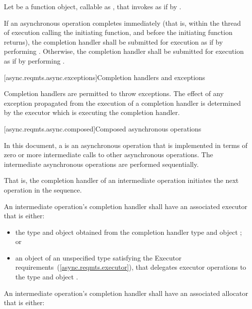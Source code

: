 \pnum
Let  be a function object, callable as , that invokes  as if by .

\pnum
If an asynchronous operation completes immediately (that is, within the thread of execution calling the initiating function, and before the initiating function returns), the completion handler shall be submitted for execution as if by performing . Otherwise, the completion handler shall be submitted for execution as if by performing .



[async.reqmts.async.exceptions]{Completion handlers and exceptions}

\pnum
 Completion handlers are permitted to throw exceptions. The effect of any exception propagated from the execution of a completion handler is determined by the executor which is executing the completion handler.



[async.reqmts.async.composed]{Composed asynchronous operations}

\pnum
In this document, a  is an asynchronous operation that is implemented in terms of zero or more intermediate calls to other asynchronous operations. The intermediate asynchronous operations are performed sequentially. \begin{note} That is, the completion handler of an intermediate operation initiates the next operation in the sequence. \end{note}

An intermediate operation's completion handler shall have an associated executor that is either:

\begin{itemize}
\item
the type  and object  obtained from the completion handler type  and object ; or

\item
an object of an unspecified type satisfying the Executor requirements~(\ref{async.reqmts.executor}), that delegates executor operations to the type  and object .
\end{itemize}

An intermediate operation's completion handler shall have an associated allocator that is either:

